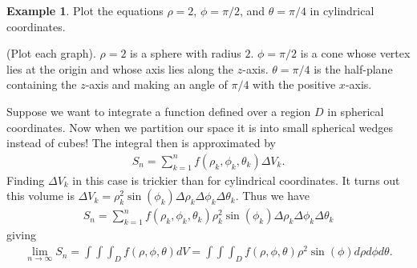 \documentclass[12pt, letter]{article}
\theoremstyle{plain}
\numberwithin{theorem}{section}
\theoremstyle{definition}
\newtheorem{example}[theorem]{Example}
\begin{document}
\bigskip

\hrulefill

\bigskip

\begin{example}
Plot the equations $\rho=2$, $\phi = \pi/2$, and $\theta=\pi/4$ in cylindrical coordinates.

\bigskip

(Plot each graph). $\rho=2$ is a sphere with radius $2$. $\phi=\pi/2$ is a cone whose vertex lies at the origin and whose axis lies along the $z$-axis. $\theta = \pi/4$ is the half-plane containing the $z$-axis and making an angle of $\pi/4$ with the positive $x$-axis.
\end{example}

\bigskip

\hrulefill

\bigskip

Suppose we want to integrate a function defined over a region $D$ in spherical coordinates. Now when we partition our space it is into small spherical wedges instead of cubes! The integral then is approximated by
\begin{align*}
S_n = \sum_{k=1}^n f(\rho_k, \phi_k, \theta_k) \Delta V_k.
\end{align*}
Finding $\Delta V_k$ in this case is trickier than for cylindrical coordinates. It turns out this volume is $\Delta V_k = \rho_k^2\sin(\phi_k)\Delta \rho_k \Delta \phi_k \Delta \theta_k$. Thus we have
\begin{align*}
S_n = \sum_{k=1}^n f(\rho_k, \phi_k, \theta_k) \rho_k^2\sin(\phi_k) \Delta \rho_k \Delta \phi_k \Delta \theta_k
\end{align*}
giving
\begin{align*}
\lim_{n\to\infty} S_n = \int\int\int_D f(\rho,\phi,\theta)dV = \int\int\int_D f(\rho,\phi,\theta) \rho^2 \sin(\phi)d\rho d\phi d\theta.
\end{align*}

\bigskip

\hrulefill

\bigskip
\end{document}
